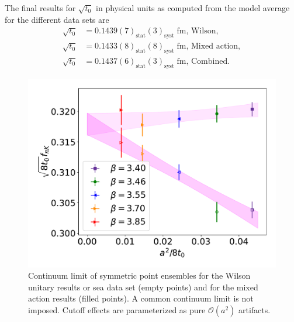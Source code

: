 The final results for $\sqrt{t_0}$ in physical units as computed from the model average for the different data sets are
\begin{align}
\label{ch_ss:eq:t0ph}
\sqrt{t_0}&=0.1439(7)_{\textrm{stat}}(3)_{\textrm{syst}}\;\textrm{fm, Wilson}, \\
\sqrt{t_0}&=0.1433(8)_{\textrm{stat}}(8)_{\textrm{syst}}\;\textrm{fm, Mixed action}, \\
\sqrt{t_0}&=0.1437(6)_{\textrm{stat}}(3)_{\textrm{syst}}\;\textrm{fm, Combined}.
\end{align}

\begin{figure}
    \centering
    \includegraphics[width=.7\textwidth]{./cap5/figs/continuum_sym.pdf}
    \caption{Continuum limit of symmetric point ensembles for the Wilson unitary results or sea data set (empty points) and for the mixed action results (filled points). A common continuum limit is not imposed. Cutoff effects are parameterized as pure $\mathcal{O}(a^2)$ artifacts.}
    \label{ch_ss:fig:universality}
\end{figure}


